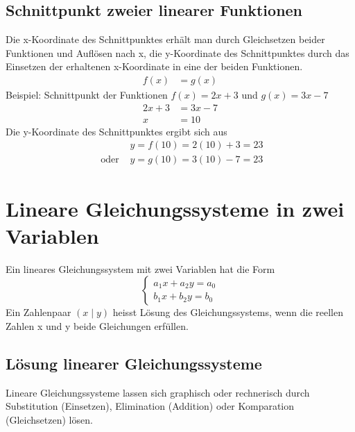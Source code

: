 \documentclass[a4paper]{article}
\begin{document}
\subsection{Schnittpunkt zweier linearer Funktionen}
Die x-Koordinate des Schnittpunktes erhält man durch Gleichsetzen beider Funktionen und Auflösen nach x, die y-Koordinate des Schnittpunktes durch das Einsetzen der erhaltenen x-Koordinate in eine der beiden Funktionen.
\begin{align*}
f(x)&=g(x)
\end{align*}
Beispiel: Schnittpunkt der Funktionen $f(x)=2x+3$ und $g(x)=3x-7$
\begin{align*}
2x+3&=3x-7 \\
x&=10
\end{align*}
Die y-Koordinate des Schnittpunktes ergibt sich aus
\begin{align*}
&y=f(10)=2(10)+3=23 \\ 
\text{ oder } &y=g(10)=3(10)-7=23
\end{align*}

\section{Lineare Gleichungssysteme in zwei Variablen}
Ein lineares Gleichungssystem mit zwei Variablen hat die Form
\[ 
\left\{
\begin{array}{l}
a_{1}x+a_{2}y=a_{0} \\
b_{1}x+b_{2}y=b_{0}
\end{array}
\right.
\]
Ein Zahlenpaar $(x \mid y)$ heisst Lösung des Gleichungssystems, wenn die reellen Zahlen x und y beide Gleichungen erfüllen.

\subsection{Lösung linearer Gleichungssysteme}
Lineare Gleichungssysteme lassen sich graphisch oder rechnerisch durch Substitution (Einsetzen), Elimination (Addition) oder Komparation (Gleichsetzen) lösen.
\end{document}
